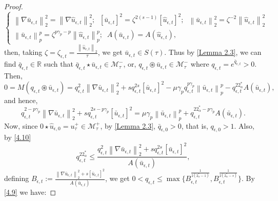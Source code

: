 \documentclass[11pt]{article}
\numberwithin{equation}{section}
\numberwithin{mytheorem}{section}
\begin{document}
\begin{proof}
\begin{equation}
				\left\{
				\begin{array}{c}
					\left\| \nabla \bar{u}_{\epsilon,t} \right\|_2^2=\left\| \nabla\hat{u}_{\epsilon,t}\right\| _2^2; \;\;
					[\bar{u}_{\epsilon,t}]^2 = \zeta^{2(s-1)}[\hat{u}_{\epsilon,t}]^2;\;\;\left\| \bar{u}_{\epsilon,t}\right\|_2^2=\zeta^{-2}\left\| \hat{u}_{\epsilon,t} \right\|_2^2\\
					\left\| \bar{u}_{\epsilon,t} \right\|_p^p=\zeta^{p\gamma_p-p}\left\| \hat{u}_{\epsilon,t}\right\|_p^p;\;\; A(\bar{u}_{\epsilon,t})= A(\hat{u}_{\epsilon,t}),
				\end{array}
				\right.
			\end{equation}
			then, taking $\zeta=\zeta_{\epsilon,t}=\frac{\left\| \hat{u}_{\epsilon,t}\right\|_2}{\tau}$, we get $\bar{u}_{\epsilon,t}\in S(\tau)$. %
			Thus by \autoref{Lemma 2.3}, we can find $\bar{q}_{\epsilon,t}\in \mathbb{R}$ such that $\bar{q}_{\epsilon,t}\star \bar{u}_{\epsilon,t}\in \mathcal{M}_{\tau}^-$, or, $q_{\epsilon,t}\circledast \bar{u}_{\epsilon,t}\in \mathcal{M}_{\tau}^-$ where $q_{\epsilon,t}=e^{\bar{q}_{\epsilon,t}}>0$. Then,
			\begin{equation*}
				0  =  M(q_{\epsilon,t}\circledast \bar{u}_{\epsilon,t}) = q_{\epsilon,t}^2 \left\| \nabla \bar{u}_{\epsilon,t} \right\|_2^2+s q_{\epsilon,t}^{2s}[\bar{u}_{\epsilon,t}]^2-\mu\gamma_p q_{\epsilon,t}^{p\gamma_p}\left\| \bar{u}_{\epsilon,t}\right\|_p^p-q_{\epsilon,t}^{22^*_{\alpha}}A(\bar{u}_{\epsilon,t}),
			\end{equation*}
			and hence,
			\begin{equation}\label{4.10}
				q_{\epsilon,t}^{2-p\gamma_p} \left\| \nabla \bar{u}_{\epsilon,t} \right\|_2^2+s q_{\epsilon,t}^{2s-p\gamma_p}[\bar{u}_{\epsilon,t}]^2=\mu\gamma_p \left\| \bar{u}_{\epsilon,t}\right\|_p^p+q_{\epsilon,t}^{22^*_{\alpha}-p\gamma_p}A(\bar{u}_{\epsilon,t}).
			\end{equation}
			Now, since $0\star \hat{u}_{\epsilon,0}=u_{\tau}^+\in \mathcal{M}_{\tau}^+$, by \autoref{Lemma 2.3}, $\bar{q}_{\epsilon,0}>0$, that is, $q_{\epsilon,0}>1$. Also, by \eqref{4.10}
			\begin{equation*}
				q_{\epsilon,t}^{22^*_{\alpha}} \leq \frac{q_{\epsilon,t}^2 \left\| \nabla\bar{u}_{\epsilon,t}\right\|_2^2+sq_{\epsilon,t}^{2s}[\bar{u}_{\epsilon,t}]^2}{A(\bar{u}_{\epsilon,t})},
			\end{equation*}
			defining $B_{\epsilon,t}:=\frac{\left\| \nabla \bar{u}_{\epsilon,t}\right\|_2^2+s[\bar{u}_{\epsilon,t}]^2}{A(\bar{u}_{\epsilon,t})}$, we get $0<q_{\epsilon,t}\leq \max\{B_{\epsilon,t}^{\frac{1}{2(2^*_{\alpha}-1)}}, B_{\epsilon,t}^{\frac{1}{2(2^*_{\alpha}-s)}}\}$. By \eqref{4.9} we have:

\end{proof}
\end{document}
